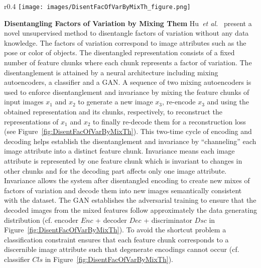 \documentclass[a4paper,12pt]{report}
\begin{document}
\begin{wrapfigure}{r}{0.4\textwidth}
\texttt{[image: images/DisentFacOfVarByMixTh\_figure.png]} 
\caption{Architecture by Hu~\textit{et al.}~\cite{DisentFacOfVarByMixTh}.}
\label{fig:DisentFacOfVarByMixTh}
\end{wrapfigure}
\par \textbf{Disentangling Factors of Variation by Mixing Them} Hu~\textit{et al.}~\cite{DisentFacOfVarByMixTh} present a novel unsupervised method to disentangle factors of variation without any data knowledge. The factors of variation correspond to image attributes such as the pose or color of objects. The disentangled representation consists of a fixed number of feature chunks where each chunk represents a factor of variation. The disentanglement is attained by a neural architecture including mixing autoencoders, a classifier and a GAN. A sequence of two mixing autoencoders is used to enforce disentanglement and invariance by mixing the feature chunks of input images $x_1$ and $x_2$ to generate a new image $x_3$, re-encode $x_3$ and using the obtained representation and its chunks, respectively, to reconstruct the representations of $x_1$ and $x_2$ to finally re-decode them for a reconstruction loss (see Figure~\ref{fig:DisentFacOfVarByMixTh}). This two-time cycle of encoding and decoding helps establish the disentanglement and invariance by ``channeling'' each image attribute into a distinct feature chunk. Invariance means each image attribute is represented by one feature chunk which is invariant to changes in other chunks and for the decoding part affects only one image attribute. Invariance allows the system after disentangled encoding to create new mixes of factors of variation and decode them into new images semantically consistent with the dataset. The GAN establishes the adversarial training to ensure that the decoded images from the mixed features follow approximately the data generating distribution (cf. encoder $Enc$ + decoder $Dec$ + discriminator $Dsc$ in Figure~\ref{fig:DisentFacOfVarByMixTh}). To avoid the shortcut problem a classification constraint ensures that each feature chunk corresponds to a discernible image attribute such that degenerate encodings cannot occur (cf. classifier $Cls$ in Figure~\ref{fig:DisentFacOfVarByMixTh}).
\end{document}
